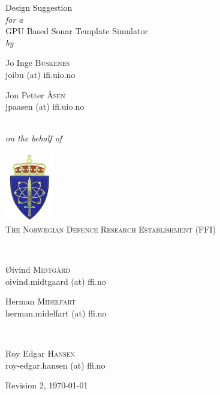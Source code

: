\documentclass[
   article                                      %
 , 12pt                                         %
 , xelatex                                      %
 , bibtex                                       %
 , layout
]{common/mytemplate}
\begin{document}

\thispagestyle{empty}

\begin{center}

{\Large Design Suggestion}\\[0.2cm]
{\itshape for a}\\[0.2cm]
{\Large GPU Based Sonar Template Simulator}\\[2cm]
{\itshape by}\\[0.2cm]
\begin{minipage}{0.35\textwidth}\small\centering
Jo Inge \textsc{Buskenes}\\
\textnormal{\color{SeaGreen}joibu (at) ifi.uio.no}
\end{minipage}
\begin{minipage}{0.35\textwidth}\small\centering
Jon Petter \textsc{Åsen}\\
\textnormal{\color{SeaGreen}jpaasen (at) ifi.uio.no}
\end{minipage}\\[2cm]
{\itshape on the behalf of}\\[0.2cm]
\begin{minipage}[t]{0.49\textwidth}\centering
  \centering\includegraphics[height=3cm]{gfx/FFILogo.png}\\
  \textsc{The Norwegian Defence Research Establishment (FFI)}
\end{minipage}\\[0.5cm]
\begin{minipage}[t]{0.4\textwidth}\small\centering
Øivind \textsc{Midtgård}\\
\textnormal{\color{SeaGreen}oivind.midtgaard (at) ffi.no}
\end{minipage}
\begin{minipage}[t]{0.4\textwidth}\small\centering
Herman \textsc{Midelfart}\\
\textnormal{\color{SeaGreen}herman.midelfart (at) ffi.no}
\end{minipage}\\[0.3cm]
\begin{minipage}{0.32\textwidth}\small\centering
Roy Edgar \textsc{Hansen}\\
\textnormal{\color{SeaGreen}roy-edgar.hansen (at) ffi.no}
\end{minipage}
\vfill
\small
Revision 2, \today
\end{center}
\end{document}
